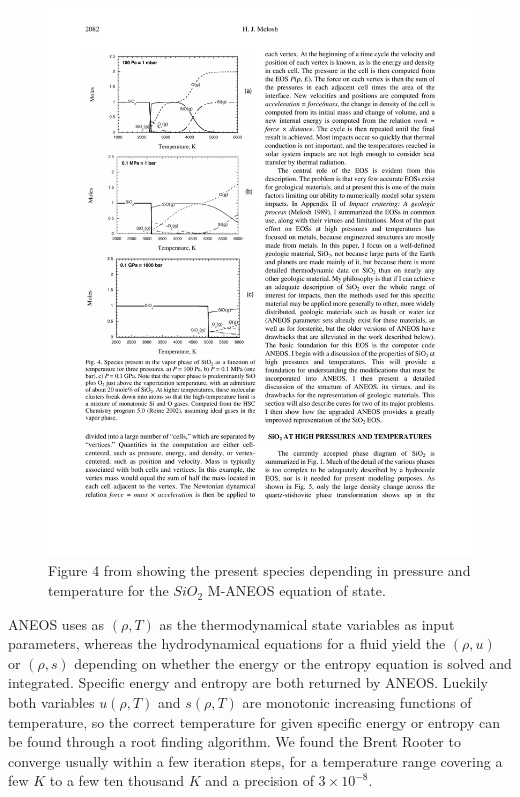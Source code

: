 \begin{figure}
\includegraphics[scale=1.0]{05aneos_phases03}
\caption{Figure 4 from \cite{Melosh:2007p3502} showing the present species depending in pressure and temperature for the $SiO_2$ M-ANEOS equation of state.}
\label{ch02_fig05}
\end{figure}

ANEOS uses as $(\rho, T)$ as the thermodynamical state variables as input parameters, whereas the hydrodynamical equations for a fluid yield the $(\rho, u)$ or $(\rho, s)$ depending on whether the energy or the entropy equation is solved and integrated. Specific energy and entropy are both returned by ANEOS. Luckily both variables $u(\rho, T)$ and  $s(\rho, T)$ are monotonic increasing functions of temperature, so the correct temperature for given specific energy or entropy can be found through a root finding algorithm. We found the Brent Rooter \cite{Press2002nrc..book.....P} to converge usually within a few iteration steps, for a temperature range covering a few $K$ to a few ten thousand $K$ and a precision of $3 \times 10^{-8}$.

